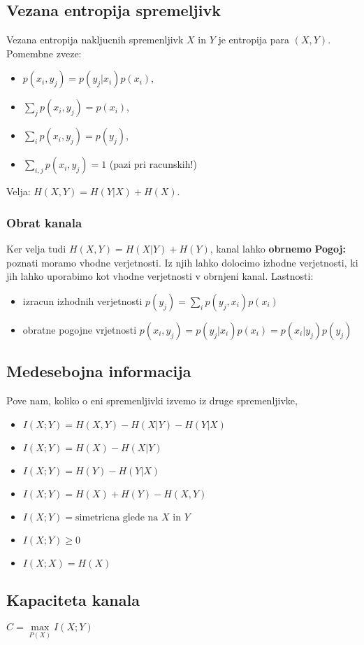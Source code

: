 \documentclass{article}
\begin{document}
\begin{multicols}{4}
	\subsection{Vezana entropija spremeljivk}
	Vezana entropija nakljucnih spremenljivk $X$ in $Y$ je entropija para $(X, Y)$.
	Pomembne zveze:
	\begin{itemize}
		\item $p(x_i, y_j) = p(y_j| x_i)p(x_i)$,
		\item $\sum_j p(x_i, y_j) = p(x_i)$,
		\item $\sum_i p(x_i, y_j) = p(y_j)$,
		\item $\sum_{i,j} p(x_i, y_j) = 1$ (pazi pri racunskih!)
	\end{itemize}
	Velja: $H(X, Y) = H(Y|X) + H(X)$.
	\subsubsection{Obrat kanala}
	Ker velja tudi $H(X, Y) = H(X|Y) + H(Y)$, kanal lahko \textbf{obrnemo}
	\textbf{Pogoj:}  poznati moramo vhodne verjetnosti. Iz njih lahko dolocimo izhodne verjetnosti, ki jih lahko
	uporabimo kot vhodne verjetnosti v obrnjeni kanal.
	Lastnosti:
	\begin{itemize}
		\item izracun izhodnih verjetnosti $p(y_j) = \sum_i p(y_j, x_i)p(x_i)$
		\item obratne pogojne vrjetnosti $p(x_i, y_j)= p(y_j|x_i)p(x_i) = p(x_i|y_j)p(y_j)$
	\end{itemize}

	\subsection{Medesebojna informacija}
	Pove nam, koliko o eni spremenljivki izvemo iz druge spremenljivke,
	\begin{itemize}
		\item $I(X;Y) = H(X, Y) - H(X|Y) - H(Y|X)$
		\item $I(X;Y) = H(X) - H(X|Y)$
		\item $I(X;Y) = H(Y) - H(Y|X)$
		\item $I(X;Y) = H(X) + H(Y) - H(X, Y)$
		\item $I(X;Y) = \text{simetricna glede na } X \text{ in } Y$
		\item $I(X;Y) \geq 0$
		\item $I(X;X) = H(X)$
	\end{itemize}

	\subsection{Kapaciteta kanala}
	\begin{center}
		$C =\underset{P(X)}{\max} I(X;Y)$
	\end{center}

\end{multicols}
\end{document}
